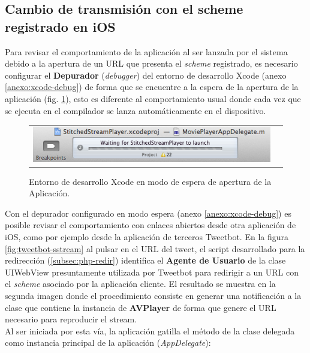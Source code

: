   \subsection{Cambio de transmisión con el scheme registrado en iOS}
  
  Para revisar el comportamiento de la aplicación al ser lanzada por el sistema debido a la apertura de un URL que presenta el \textit{scheme} registrado, es necesario configurar el \textbf{Depurador} (\textit{debugger}) del entorno de desarrollo Xcode (anexo \ref{anexo:xcode-debug}) de forma que se encuentre a la espera de la apertura de la aplicación (fig. \ref{fig:xcode-waitforapp}), esto es diferente al comportamiento usual donde cada vez que se ejecuta en el compilador se lanza automáticamente en el dispositivo.\\

  \begin{figure}[H]
	\centering
	\begin{tabular}{cc}
	\includegraphics[scale=0.7]{imgs/xcode-waitforapp.png}
	\end{tabular}
	\caption{Entorno de desarrollo Xcode en modo de espera de apertura de la Aplicación.}
	\label{fig:xcode-waitforapp}
\end{figure}

Con el depurador configurado en modo espera (anexo \ref{anexo:xcode-debug}) es posible revisar el comportamiento con enlaces abiertos desde otra aplicación de iOS, como por ejemplo desde la aplicación de terceros Tweetbot. En la figura \ref{fig:tweetbot-sstream} al pulsar en el URL del tweet, el script desarrollado para la redirección (\ref{subsec:php-redir}) identifica el \textbf{Agente de Usuario} de la clase UIWebView presuntamente utilizada por Tweetbot para redirigir a un URL con el \textit{scheme} asociado por la aplicación cliente. El resultado se muestra en la segunda imagen donde el procedimiento consiste en generar una notificación a la clase que contiene la instancia de \textbf{AVPlayer} de forma que genere el URL necesario para reproducir el stream.\\

Al ser iniciada por esta vía, la aplicación gatilla el método de la clase delegada como instancia principal de la aplicación (\textit{AppDelegate}):\\


